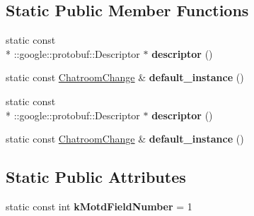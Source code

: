 \subsection*{Static Public Member Functions}
\begin{DoxyCompactItemize}
\item 
\hypertarget{classSimpleChat_1_1ChatroomChange_adc74eaea837bb075beb29d246a73f986}{static const \\*
\-::google\-::protobuf\-::\-Descriptor $\ast$ {\bfseries descriptor} ()}\label{classSimpleChat_1_1ChatroomChange_adc74eaea837bb075beb29d246a73f986}

\item 
\hypertarget{classSimpleChat_1_1ChatroomChange_a96ace485d34ac90c2bfbf2aa72d8485d}{static const \hyperlink{classSimpleChat_1_1ChatroomChange}{Chatroom\-Change} \& {\bfseries default\-\_\-instance} ()}\label{classSimpleChat_1_1ChatroomChange_a96ace485d34ac90c2bfbf2aa72d8485d}

\item 
\hypertarget{classSimpleChat_1_1ChatroomChange_adc74eaea837bb075beb29d246a73f986}{static const \\*
\-::google\-::protobuf\-::\-Descriptor $\ast$ {\bfseries descriptor} ()}\label{classSimpleChat_1_1ChatroomChange_adc74eaea837bb075beb29d246a73f986}

\item 
\hypertarget{classSimpleChat_1_1ChatroomChange_a96ace485d34ac90c2bfbf2aa72d8485d}{static const \hyperlink{classSimpleChat_1_1ChatroomChange}{Chatroom\-Change} \& {\bfseries default\-\_\-instance} ()}\label{classSimpleChat_1_1ChatroomChange_a96ace485d34ac90c2bfbf2aa72d8485d}

\end{DoxyCompactItemize}
\subsection*{Static Public Attributes}
\begin{DoxyCompactItemize}
\item 
\hypertarget{classSimpleChat_1_1ChatroomChange_a956e20939e35e9b0cfa0ab54407634ab}{static const int {\bfseries k\-Motd\-Field\-Number} = 1}\label{classSimpleChat_1_1ChatroomChange_a956e20939e35e9b0cfa0ab54407634ab}

\end{DoxyCompactItemize}
